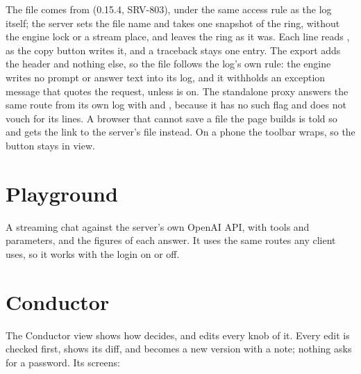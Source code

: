 The file comes from  (0.15.4, SRV-803), under the same access rule as the log itself; the server sets the file name and takes one snapshot of the ring, without the engine lock or a stream place, and leaves the ring as it was. Each line reads , as the copy button writes it, and a traceback stays one entry. The export adds the header and nothing else, so the file follows the log's own rule: the engine writes no prompt or answer text into its log, and it withholds an exception message that quotes the request, unless  is on. The standalone proxy answers the same route from its own log with  and , because it has no such flag and does not vouch for its lines. A browser that cannot save a file the page builds is told so and gets the link to the server's file instead. On a phone the toolbar wraps, so the button stays in view.


\section{Playground}

A streaming chat against the server's own OpenAI API, with tools and parameters, and the figures of each answer. It uses the same routes any client uses, so it works with the login on or off.


\section{Conductor}

The Conductor view shows how  decides, and edits every knob of it. Every edit is checked first, shows its diff, and becomes a new version with a note; nothing asks for a password. Its screens:

